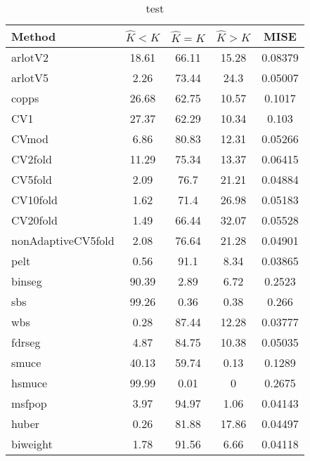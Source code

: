 \begin{table}[ht]
\centering
\begin{tabular}{l|cccc}
  \hline
Method & $\hat{K} < K$ & $\hat{K} = K$ & $\hat{K} > K$ & MISE \\ 
  \hline
arlotV2 & 18.61 & 66.11 & 15.28 & 0.08379 \\ 
  arlotV5 &  2.26 & 73.44 &  24.3 & 0.05007 \\ 
  copps & 26.68 & 62.75 & 10.57 & 0.1017 \\ 
  CV1 & 27.37 & 62.29 & 10.34 & 0.103 \\ 
  CVmod &  6.86 & 80.83 & 12.31 & 0.05266 \\ 
  CV2fold & 11.29 & 75.34 & 13.37 & 0.06415 \\ 
  CV5fold &  2.09 &  76.7 & 21.21 & 0.04884 \\ 
  CV10fold &  1.62 &  71.4 & 26.98 & 0.05183 \\ 
  CV20fold &  1.49 & 66.44 & 32.07 & 0.05528 \\ 
  nonAdaptiveCV5fold &  2.08 & 76.64 & 21.28 & 0.04901 \\ 
  pelt &  0.56 &  91.1 &  8.34 & 0.03865 \\ 
  binseg & 90.39 &  2.89 &  6.72 & 0.2523 \\ 
  sbs & 99.26 &  0.36 &  0.38 & 0.266 \\ 
  wbs &  0.28 & 87.44 & 12.28 & 0.03777 \\ 
  fdrseg &  4.87 & 84.75 & 10.38 & 0.05035 \\ 
  smuce & 40.13 & 59.74 &  0.13 & 0.1289 \\ 
  hsmuce & 99.99 &  0.01 &     0 & 0.2675 \\ 
  msfpop &  3.97 & 94.97 &  1.06 & 0.04143 \\ 
  huber &  0.26 & 81.88 & 17.86 & 0.04497 \\ 
  biweight &  1.78 & 91.56 &  6.66 & 0.04118 \\ 
   \hline
\end{tabular}
\caption{test} 
\end{table}
